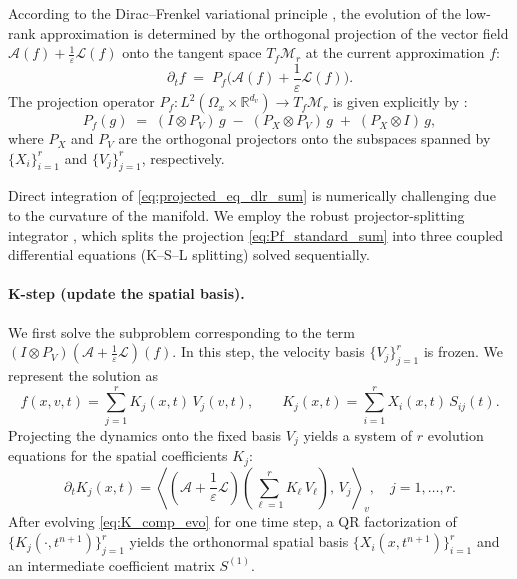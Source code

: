 \documentclass[]{article}
\numberwithin{equation}{section}
\begin{document}
According to the Dirac--Frenkel variational principle \cite{koch2007dynamical, lubich2008quantum}, the evolution of the low-rank approximation is determined by the orthogonal projection of the vector field \(\mathcal{A}(f) + \frac{1}{\varepsilon}\mathcal{L}(f)\) onto the tangent space \(T_f\mathcal{M}_r\) at the current approximation \(f\):
\begin{equation}\label{eq:projected_eq_dlr_sum}
  \partial_t f \;=\; P_f\big(\mathcal{A}(f) + \frac{1}{\varepsilon}\mathcal{L}(f)\big).
\end{equation}
The projection operator \(P_f: L^2(\Omega_x \times \mathbb{R}^{d_v}) \to T_f\mathcal{M}_r\) is given explicitly by \cite{lubich2014projector}:
\begin{equation}\label{eq:Pf_standard_sum}
  P_f(g) \;=\; (I \otimes P_V)\,g \;-\; (P_X \otimes P_V)\,g \;+\;
(P_X \otimes I)\,g,
\end{equation}
where \(P_X\) and \(P_V\) are the orthogonal projectors onto the subspaces spanned by \(\{X_i\}_{i=1}^{r}\) and \(\{V_j\}_{j=1}^{r}\), respectively.

Direct integration of \eqref{eq:projected_eq_dlr_sum} is numerically challenging due to the curvature of the manifold. We employ the robust projector-splitting integrator \cite{lubich2014projector}, which splits the projection \eqref{eq:Pf_standard_sum} into three coupled differential equations (K--S--L splitting) solved sequentially.

\paragraph{K-step (update the spatial basis).}
We first solve the subproblem corresponding to the term \((I \otimes P_V)(\mathcal{A}+\frac{1}{\varepsilon}\mathcal{L})(f)\). In this step, the velocity basis \(\{V_j\}_{j=1}^{r}\) is frozen. We represent the solution as
\begin{equation}\label{eq:f_K_form}
    f(x,v,t) = \sum_{j=1}^r K_j(x,t)\,V_j(v,t), \qquad
    K_j(x,t) = \sum_{i=1}^r X_i(x,t)\,S_{ij}(t).
\end{equation}
Projecting the dynamics onto the fixed basis \(V_j\) yields a system of \(r\) evolution equations for the spatial coefficients \(K_j\):
\begin{equation}\label{eq:K_comp_evo}
    \partial_t K_j(x,t) = \left\langle (\mathcal{A} + \frac{1}{\varepsilon}\mathcal{L}) \left(\sum_{\ell=1}^r K_\ell\,V_\ell\right),\, V_j \right\rangle_v,
    \quad j=1,\dots,r.
\end{equation}
After evolving \eqref{eq:K_comp_evo} for one time step, a QR factorization of \(\{K_j(\cdot, t^{n+1})\}_{j=1}^{r}\) yields the orthonormal spatial basis \(\{X_i(x,t^{n+1})\}_{i=1}^{r}\) and an intermediate coefficient matrix \(S^{(1)}\).
\end{document}
